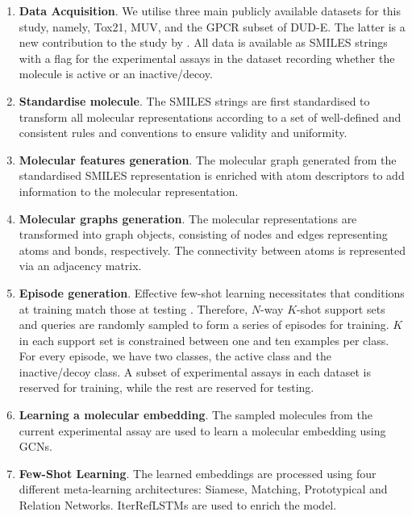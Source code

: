 \begin{enumerate}
    \item \textbf{Data Acquisition}. We utilise three main publicly available datasets for this study, namely, Tox21, MUV, and the GPCR subset of DUD-E. The latter is a new contribution to the study by \citet{altae2017low}. All data is available as SMILES strings with a flag for the experimental assays in the dataset recording whether the molecule is active or an inactive/decoy.

    \item \textbf{Standardise molecule}. The SMILES strings are first standardised to transform all molecular representations according to a set of well-defined and consistent rules and conventions to ensure validity and uniformity.

    \item \textbf{Molecular features generation}. The molecular graph generated from the standardised SMILES representation is enriched with atom descriptors to add information to the molecular representation.

    \item \textbf{Molecular graphs generation}. The molecular representations are transformed into graph objects, consisting of nodes and edges representing atoms and bonds, respectively. The connectivity between atoms is represented via an adjacency matrix.

    \item \textbf{Episode generation}. Effective few-shot learning necessitates that conditions at training match those at testing \citep{vinyals2016matching}. Therefore, $N$-way $K$-shot support sets and queries are randomly sampled to form a series of episodes for training. $K$ in each support set is constrained between one and ten examples per class. For every episode, we have two classes, the active class and the inactive/decoy class. A subset of experimental assays in each dataset is reserved for training, while the rest are reserved for testing.

    \item \textbf{Learning a molecular embedding}. The sampled molecules from the current experimental assay are used to learn a molecular embedding using GCNs.

    \item \textbf{Few-Shot Learning}. The learned embeddings are processed using four different meta-learning architectures: Siamese, Matching, Prototypical and Relation Networks. IterRefLSTMs \citep{altae2017low} are used to enrich the model.  


\end{enumerate}
